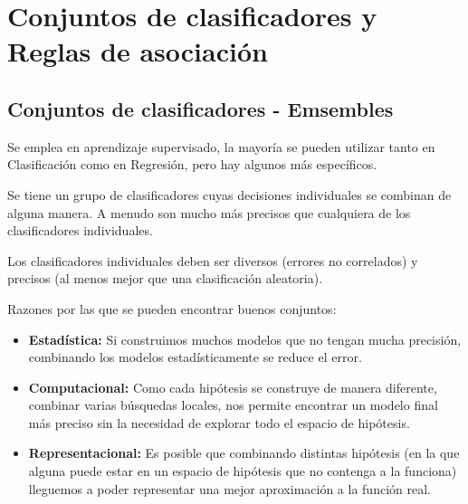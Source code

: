 \documentclass[12pt]{report} %
\begin{document}
\chapter{Conjuntos de clasificadores y Reglas de asociación}
\section{Conjuntos de clasificadores - Emsembles}
Se emplea en aprendizaje supervisado, la mayoría se pueden utilizar tanto en Clasificación como en Regresión, pero hay algunos más específicos.

Se tiene un grupo de clasificadores cuyas decisiones individuales se combinan de alguna manera. A menudo son mucho más precisos que cualquiera de los clasificadores individuales.

Los clasificadores individuales deben ser diversos (errores no correlados) y precisos (al menos mejor que una clasificación aleatoria).

Razones por las que se pueden encontrar buenos conjuntos:
\begin{itemize}
  \item \textbf{Estadística:} Si construimos muchos modelos que no tengan mucha precisión, combinando los modelos estadísticamente se reduce el error.
  \item \textbf{Computacional:} Como cada hipótesis se construye de manera diferente, combinar varias búsquedas locales, nos permite encontrar un modelo final más preciso sin la necesidad de explorar todo el espacio de hipótesis.
  \item \textbf{Representacional:} Es posible que combinando distintas hipótesis (en la que alguna puede estar en un espacio de hipótesis que no contenga a la funciona) lleguemos a poder representar una mejor aproximación a la función real.
\end{itemize}
\end{document}
